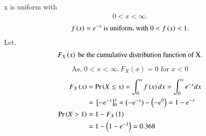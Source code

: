 
x is uniform with 
\begin{align}
    0<x<\infty.  
\end{align}
\begin{align}
    f\left(x\right) = e^{-x} \text{ is uniform, with } 0<f\left(x\right)<1.
\end{align}
Let, 
\begin{align}
    F_X\left(x\right) \text{ be the cumulative distribution function of X.}
\end{align}
\begin{align}
    \text{As, }0<x<\infty, F_X(x) = 0 \text{ for } x<0 
\end{align}
\begin{align}
    F_X\left(x\right) &= \Pr\left(X \leq x\right) = \int_{0}^{x} f\left(x\right) dx = \int_{0}^{x} e^{-x} dx
    \\&={}\left[-e^{-x}\right]_{0}^{x} = \left(-e^{-x}\right) - \left(-e^{0}\right) = 1-e^{-x}
    \\\Pr\left(X > 1\right) &= 1 - F_X\left(1\right)
    \\&= 1 - \left(1-e^{-1}\right) = 0.368
\end{align}